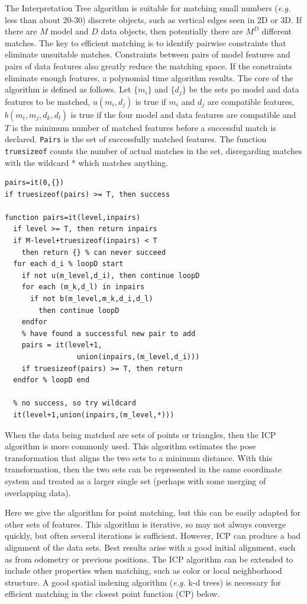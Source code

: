 \documentclass[twocolumn,oneside]{book}
\begin{document}
The Interpretation Tree algorithm \cite{grimson} is suitable for matching
small numbers ({\it e.g.} less than about 20-30) discrete objects, such
as vertical edges seen in 2D or 3D. If there are $M$ model and $D$ data 
objects, then potentially there are $M^D$ different matches. 
The key to efficient matching is to identify pairwise constraints that
eliminate unsuitable matches.
Constraints between pairs of model features and pairs of data
features also greatly reduce the matching space. If the constraints
eliminate enough features, a polynomial time algorithm results.
The core of the algorithm is defined as follows.
Let $\{m_i\}$ and $\{d_j\}$ be the sets po model and data features to
be matched, $u(m_i,d_j)$ is true if $m_i$ and $d_j$ are compatible
features, $b(m_i,m_j,d_k,d_l)$ is true if the four model and data features
are compatible and $T$ is the minimum number of matched features before
a successful match is declared.
\verb+Pairs+ is the set of successfully matched features.
The function \verb+truesizeof+ counts the number of actual matches in the
set, disregarding matches with the wildcard * which matches anything.
\begin{verbatim}
pairs=it(0,{})
if truesizeof(pairs) >= T, then success

function pairs=it(level,inpairs)
  if level >= T, then return inpairs
  if M-level+truesizeof(inpairs) < T
    then return {} % can never succeed
  for each d_i % loopD start
    if not u(m_level,d_i), then continue loopD
    for each (m_k,d_l) in inpairs
      if not b(m_level,m_k,d_i,d_l)
        then continue loopD
    endfor
    % have found a successful new pair to add
    pairs = it(level+1,
                 union(inpairs,(m_level,d_i)))
    if truesizeof(pairs) >= T, then return
  endfor % loopD end

  % no success, so try wildcard  
  it(level+1,union(inpairs,(m_level,*)))
\end{verbatim}

When the data being matched are sets of points or triangles,
then the ICP algorithm \cite{besl2} is more commonly used.
This algorithm estimates the pose transformation that aligns the
two sets to a minimum distance.
With this transformation, then the two sets can be represented in the
same coordinate system and treated as a larger single set (perhaps
with some merging of overlapping data).

Here we give the algorithm for point matching, but this can be
easily adapted for other sets of features.
This algorithm is iterative, so may not always converge quickly, but
often several iterations is sufficient.
However, ICP can produce a bad alignment of the data sets.
Best results arise with a good initial alignment, such as from
odometry or previous positions.
The ICP algorithm can be extended to include other properties when
matching, such as color or local neighborhood structure.
A good spatial indexing algorithm ({\it e.g.} k-d trees) 
is necessary for efficient matching
in the closest point function (CP) below.
\end{document}
